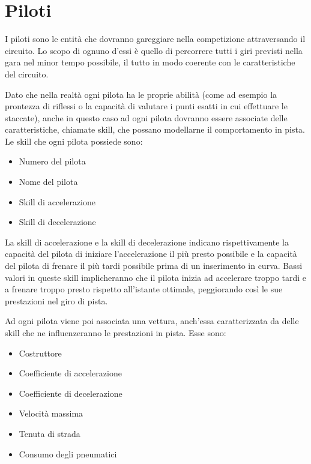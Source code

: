 \documentclass[a4paper,11pt, twoside]{book}
\begin{document}
    \section{Piloti}
      I piloti sono le entità che dovranno gareggiare nella competizione attraversando il circuito.
      Lo scopo di ognuno d'essi è quello di percorrere tutti i giri previsti nella gara nel minor tempo possibile,
      il tutto in modo coerente con le caratteristiche del circuito.
      
      Dato che nella realtà ogni pilota ha le proprie abilità (come ad esempio la prontezza di riflessi
      o la capacità di valutare i punti esatti in cui effettuare le staccate),
      anche in questo caso ad ogni pilota dovranno essere associate delle caratteristiche, chiamate skill, che possano
      modellarne il comportamento in pista. Le skill che ogni pilota possiede sono:
      
      \begin{itemize}
	\item Numero del pilota
	\item Nome del pilota
	\item Skill di accelerazione
	\item Skill di decelerazione
      \end{itemize}
      
      La skill di accelerazione e la skill di decelerazione indicano rispettivamente la capacità del pilota di 
      iniziare l'accelerazione 
      il più presto possibile e la capacità del pilota di frenare 
      il più tardi possibile prima di un inserimento in curva. Bassi valori in queste skill implicheranno che il pilota 
      inizia ad accelerare troppo tardi e a frenare troppo presto 
      rispetto all'istante ottimale, peggiorando così le sue prestazioni nel giro di pista.
      
      Ad ogni pilota viene poi associata una vettura, anch'essa caratterizzata da delle skill che ne influenzeranno
      le prestazioni in pista. Esse sono:
      
      \begin{itemize}
	\item Costruttore
	\item Coefficiente di accelerazione
	\item Coefficiente di decelerazione
	\item Velocità massima
	\item Tenuta di strada
	\item Consumo degli pneumatici
      \end{itemize}
      
\end{document}
